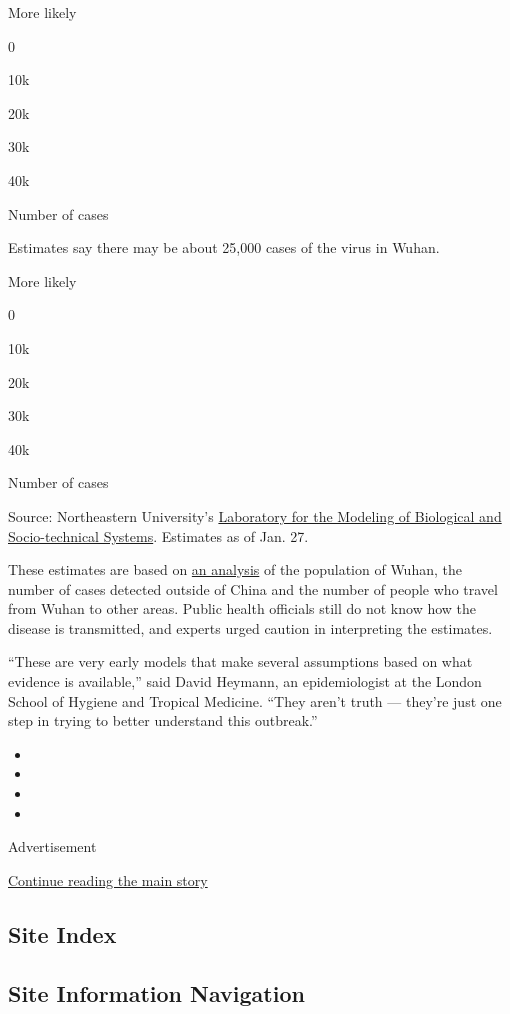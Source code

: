 More likely

0

10k

20k

30k

40k

Number of cases

Estimates say there may be about 25,000 cases of the virus in Wuhan.

More likely

0

10k

20k

30k

40k

Number of cases

Source: Northeastern University's
\href{https://www.mobs-lab.org/2019ncov.html}{Laboratory for the
Modeling of Biological and Socio-technical Systems}. Estimates as of
Jan. 27.

These estimates are based on
\href{https://www.mobs-lab.org/2019ncov.html}{an analysis} of the
population of Wuhan, the number of cases detected outside of China and
the number of people who travel from Wuhan to other areas. Public health
officials still do not know how the disease is transmitted, and experts
urged caution in interpreting the estimates.

``These are very early models that make several assumptions based on
what evidence is available,'' said David Heymann, an epidemiologist at
the London School of Hygiene and Tropical Medicine. ``They aren't truth
--- they're just one step in trying to better understand this
outbreak.''

\begin{itemize}
\item
\item
\item
\item
\end{itemize}

Advertisement

\protect\hyperlink{after-bottom}{Continue reading the main story}

\hypertarget{site-index}{%
\subsection{Site Index}\label{site-index}}

\hypertarget{site-information-navigation}{%
\subsection{Site Information
Navigation}\label{site-information-navigation}}

